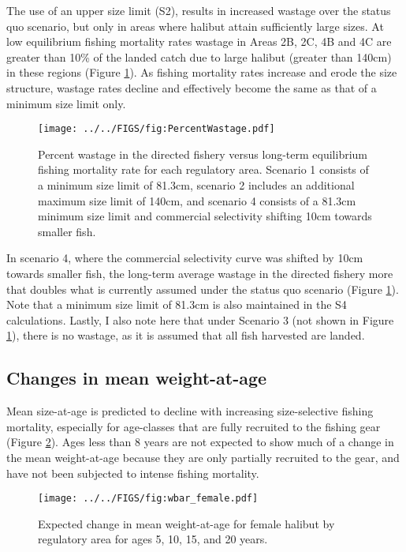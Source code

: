 The use of an upper size limit (S2), results in increased wastage over the status quo scenario, but only in areas where halibut attain sufficiently large sizes. At low equilibrium fishing mortality rates wastage in Areas 2B, 2C, 4B and 4C are greater than 10\% of the landed catch due to large halibut (greater than 140cm) in these regions (Figure \ref{fig:FIGS_fig:PercentWastage}).  As fishing mortality rates increase and erode the size structure, wastage rates decline and effectively become the same as that of a minimum size limit only.  

\begin{figure}[htbp]
	\centering
		\texttt{[image: ../../FIGS/fig:PercentWastage.pdf]}
	\caption{Percent wastage in the directed fishery versus long-term equilibrium fishing mortality rate for each regulatory area. Scenario 1 consists of a minimum size limit of 81.3cm, scenario 2 includes an additional maximum size limit of 140cm, and scenario 4 consists of a 81.3cm minimum size limit and commercial selectivity shifting 10cm towards smaller fish.}
	\label{fig:FIGS_fig:PercentWastage}
\end{figure}

In scenario 4, where the commercial selectivity curve was shifted by 10cm towards smaller fish, the long-term average wastage in the directed fishery more that doubles what is currently assumed under the status quo scenario (Figure \ref{fig:FIGS_fig:PercentWastage}). Note that a minimum size limit of 81.3cm is also maintained in the S4 calculations.  Lastly, I also note here that under Scenario 3 (not shown in Figure \ref{fig:FIGS_fig:PercentWastage}), there is no wastage, as it is assumed that all fish harvested are landed.


\subsection*{Changes in mean weight-at-age} %
\label{sub:changes_in_mean_weight_at_age}

Mean size-at-age is predicted to decline with increasing size-selective fishing mortality, especially for age-classes that are fully recruited to the fishing gear (Figure \ref{fig:FIGS_fig:wbar_female}).  Ages less than 8 years are not expected to show much of a change in the mean weight-at-age because they are only partially recruited to the gear, and have not been subjected to intense fishing mortality.
\begin{figure}[htbp]
	\centering
		\texttt{[image: ../../FIGS/fig:wbar\_female.pdf]}
	\caption{Expected change in mean weight-at-age for female halibut by regulatory area for ages 5, 10, 15, and 20 years.}
	\label{fig:FIGS_fig:wbar_female}
\end{figure}

